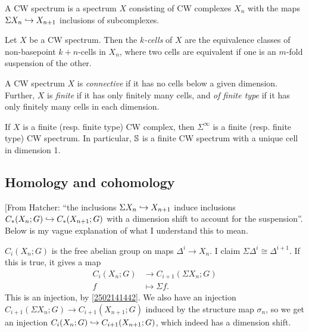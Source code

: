 \documentclass{MetricNotes2023}
\def\bb{\ensuremath\mathbb}
\def\inj{\ensuremath\hookrightarrow}
\begin{document}
\begin{definition}
A CW spectrum is a spectrum \(X\) consisting of CW complexes \(X_n\) with the maps \(\Sigma X_n \inj X_{n+1}\) inclusions of subcomplexes. 
\end{definition}

\begin{definition}
Let \(X\) be a CW spectrum. Then the \textit{\(k\)-cells} of \(X\) are the equivalence classes of non-basepoint \(k+n\)-cells in \(X_n\), where two cells are equivalent if one is an \(m\)-fold suspension of the other. 
\end{definition}



\begin{definition}
A CW spectrum \(X\) is \textit{connective} if it has no cells below a given dimension. Further, \(X\) is \textit{finite} if it has only finitely many cells, and \textit{of finite type} if it has only finitely many cells in each dimension.
\end{definition}

\begin{example}
If \(X\) is a finite (resp. finite type) CW complex, then \(\Sigma^\infty\) is a finite (resp. finite type) CW spectrum. In particular, \(\bb{S}\) is a finite CW spectrum with a unique cell in dimension 1.
\end{example}

\subsection{Homology and cohomology}

[From Hatcher: ``the inclusions \(\Sigma X_n \inj X_{n+1}\) induce inclusions \(C_*(X_n; G)\inj C_*(X_{n+1}; G)\) with a dimension shift to account for the suspension''. Below is my vague explanation of what I understand this to mean.

\(C_i(X_n; G)\) is the free abelian group on maps \(\Delta^i \to X_n\). I claim \(\Sigma\Delta^i\cong \Delta^{i+1}\). If this is true, it gives a map
\begin{align*}
C_i(X_n;G) &\to C_{i+1}(\Sigma X_n; G)\\
f &\mapsto \Sigma f.
\end{align*}
This is an injection, by \ref{2502141442}. We also have an injection \(C_{i+1}(\Sigma X_n; G)\to C_{i+1}(X_{n+1}; G)\) induced by the structure map \(\sigma_n\), so we get an injection \(C_i(X_n;G)\inj C_{i+1}(X_{n+1};G)\), which indeed has a dimension shift.
\end{document}
